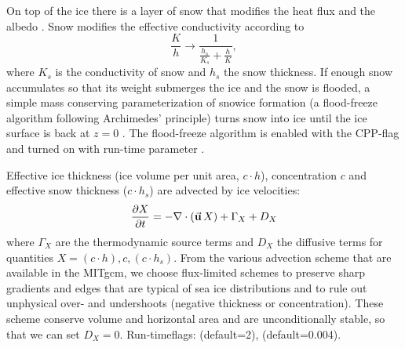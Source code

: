 On top of the ice there is a layer of snow that modifies the heat flux
and the albedo \citep{zha98a}. Snow modifies the effective
conductivity according to 
\[\frac{K}{h} \rightarrow \frac{1}{\frac{h_{s}}{K_{s}}+\frac{h}{K}},\]
where $K_s$ is the conductivity of snow and $h_s$ the snow thickness.
If enough snow accumulates so that its weight submerges the ice and
the snow is flooded, a simple mass conserving parameterization of
snowice formation (a flood-freeze algorithm following Archimedes'
principle) turns snow into ice until the ice surface is back at $z=0$
\citep{leppaeranta83}. The flood-freeze algorithm is enabled with the CPP-flag
 and turned on with run-time parameter
.

Effective ice thickness (ice volume per unit area,
$c\cdot{h}$), concentration $c$ and effective snow thickness
($c\cdot{h}_{s}$) are advected by ice velocities:
\begin{equation}
  \label{eq:advection}
  \frac{\partial{X}}{\partial{t}} = - \nabla\cdot\left(\vec{\mathbf{u}}\,X\right) +
  \Gamma_{X} + D_{X}
\end{equation}
where $\Gamma_X$ are the thermodynamic source terms and $D_{X}$ the
diffusive terms for quantities $X=(c\cdot{h}), c, (c\cdot{h}_{s})$.
%
From the various advection scheme that are available in the MITgcm, we
choose flux-limited schemes \citep[multidimensional 2nd and 3rd-order
advection scheme with flux limiter][]{roe:85, hundsdorfer94} to
preserve sharp gradients and edges that are typical of sea ice
distributions and to rule out unphysical over- and undershoots
(negative thickness or concentration). These scheme conserve volume
and horizontal area and are unconditionally stable, so that we can set
$D_{X}=0$. Run-timeflags:  (default=2),
 (default=0.004).

